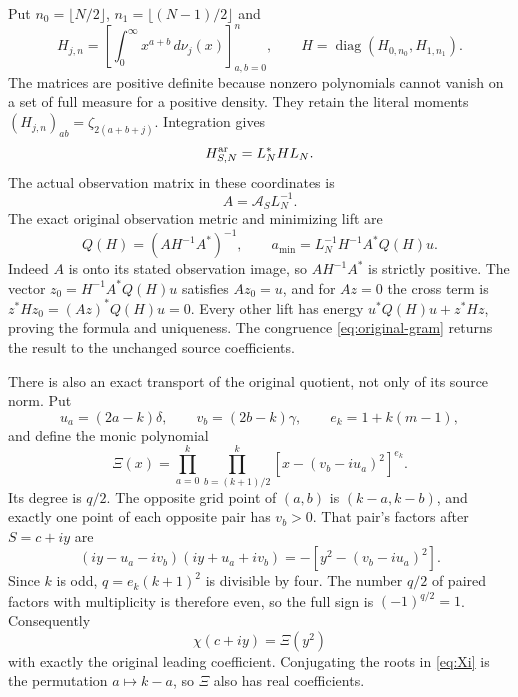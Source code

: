 \documentclass[11pt]{article}
\newcommand{\diag}{\operatorname{diag}}
\begin{document}
Put $n_0=\lfloor N/2\rfloor$, $n_1=\lfloor(N-1)/2\rfloor$ and
\begin{equation}\label{eq:parity-grams}
 H_{j,n}=\left[\int_0^\infty x^{a+b}\,d\nu_j(x)\right]_{a,b=0}^n,
 \qquad H=\diag(H_{0,n_0},H_{1,n_1}).
\end{equation}
The matrices are positive definite because nonzero polynomials
cannot vanish on a set of full measure for a positive density.
They retain the literal moments
$(H_{j,n})_{ab}=\zeta_{2(a+b+j)}$. Integration gives
\begin{equation}\label{eq:original-gram}
 H_{S,N}^{\rm ar}=L_N^*HL_N.
\end{equation}
The actual observation matrix in these coordinates is
\begin{equation}\label{eq:observation}
A=\mathcal A_SL_N^{-1}.
\end{equation}
The exact original observation metric and minimizing lift are
\begin{equation}\label{eq:Q}
 Q(H)=(AH^{-1}A^*)^{-1},\qquad
 a_{\min}=L_N^{-1}H^{-1}A^*Q(H)u.
\end{equation}
Indeed $A$ is onto its stated observation image, so $AH^{-1}A^*$
is strictly positive. The vector $z_0=H^{-1}A^*Q(H)u$ satisfies
$Az_0=u$, and for $Az=0$ the cross term is
$z^*Hz_0=(Az)^*Q(H)u=0$. Every other lift has energy
$u^*Q(H)u+z^*Hz$, proving the formula and uniqueness. The
congruence \eqref{eq:original-gram} returns the result to the
unchanged source coefficients.

There is also an exact transport of the original quotient, not
only of its source norm. Put
\[
 u_a=(2a-k)\delta,\qquad v_b=(2b-k)\gamma,\qquad
 e_k=1+k(m-1),
\]
and define the monic polynomial
\begin{equation}\label{eq:Xi}
 \Xi(x)=\prod_{a=0}^k\prod_{b=(k+1)/2}^{k}
                 [x-(v_b-iu_a)^2]^{e_k}.
\end{equation}
Its degree is $q/2$. The opposite grid point of $(a,b)$ is
$(k-a,k-b)$, and exactly one point of each opposite pair has
$v_b>0$. That pair's factors after $S=c+iy$ are
\[
 (iy-u_a-iv_b)(iy+u_a+iv_b)
          =-[y^2-(v_b-iu_a)^2].
\]
Since $k$ is odd, $q=e_k(k+1)^2$ is divisible by four. The number
$q/2$ of paired factors with multiplicity is therefore even,
so the full sign is $(-1)^{q/2}=1$. Consequently
\begin{equation}\label{eq:chi-square}
 \chi(c+iy)=\Xi(y^2)
\end{equation}
with exactly the original leading coefficient. Conjugating the
roots in \eqref{eq:Xi} is the permutation $a\mapsto k-a$, so
$\Xi$ also has real coefficients.
\end{document}
